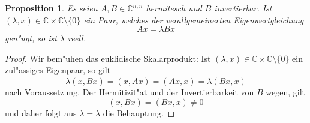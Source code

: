 \documentclass[a4paper, 11pt]{article}
\newcommand{\Cnn}{\mathbb{C}^{n,n}}
\newcommand{\C}{\mathbb{C}}
\newcommand{\Co}{\mathbb{\C}\setminus\{0\}}
\newtheorem{prop}{Proposition}
\begin{document}
\begin{prop}
Es seien $A, B \in \Cnn$ hermitesch und $B$ invertierbar. Ist $(\lambda, x)\in\C\times\Co$ ein
Paar, welches der verallgemeinerten Eigenwertgleichung
\[
Ax = \lambda Bx
\]
gen"ugt, so ist $\lambda$ reell.
\end{prop}

\begin{proof}
Wir bem"uhen das euklidische Skalarprodukt: Ist $(\lambda, x)\in\C\times\Co$ ein zul"assiges
Eigenpaar, so gilt
\[
\lambda(x,Bx) = (x,Ax) = (Ax,x) = \bar{\lambda}(Bx,x)
\]
nach Voraussetzung. Der Hermitizit"at und der Invertierbarkeit von $B$ wegen, gilt 
\[
(x,Bx)=(Bx,x) \neq 0
\]
und daher folgt aus $\lambda = \bar{\lambda}$ die Behauptung.
\end{proof}
\end{document}
